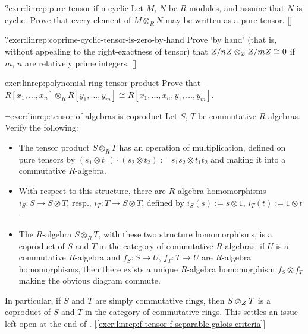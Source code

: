 \begin{exer}{$?$}{exer:linrep:pure-tensor-if-n-cyclic}
  Let $M$, $N$ be $R$-modules, and assume that $N$ is cyclic. Prove
  that every element of $M \otimes_R N$ may be written as a pure
  tensor. []
\end{exer}
\begin{exer}{$?$}{exer:linrep:coprime-cyclic-tensor-is-zero-by-hand}
  Prove `by hand' (that is, without appealing to the right-exactness
  of tensor) that $Z/nZ \otimes_{Z} Z/mZ \cong 0$ if $m$, $n$ are
  relatively prime
  integers. []
\end{exer}
\begin{exer}{}{exer:linrep:polynomial-ring-tensor-product}
  Prove that
  $R[x_1, \dots, x_n] \otimes_R R[y_1, \dots, y_m] \cong R[x_1, \dots,
  x_n, y_1, \dots, y_m]$.
\end{exer}
\begin{exer}{$\lnot$}{exer:linrep:tensor-of-algebras-is-coproduct}
  Let $S$, $T$ be commutative $R$-algebras. Verify the following:
  \begin{itemize}
  \item The tensor product $S \otimes_R T$ has an operation of
    multiplication, defined on pure tensors by
    $(s_1 \otimes t_1) \cdot (s_2 \otimes t_2) := s_1 s_2 \otimes t_1
    t_2$ and making it into a commutative $R$-algebra.
  \item With respect to this structure, there are $R$-algebra
    homomorphisms $i_S : S \to S \otimes T$, resp.,
    $i_T : T \to S \otimes T$, defined by $i_S(s) := s \otimes 1$,
    $i_T(t) := 1 \otimes t$.
  \item The $R$-algebra $S \otimes_R T$, with these two structure
    homomorphisms, is a coproduct of $S$ and $T$ in the category of
    commutative $R$-algebras: if $U$ is a commutative $R$-algebra and
    $f_S : S \to U$, $f_T : T \to U$ are $R$-algebra homomorphisms,
    then there exists a unique $R$-algebra homomorphism
    $f_S \otimes f_T$ making the obvious diagram commute.
  \end{itemize}
  In particular, if $S$ and $T$ are simply commutative rings, then
  $S \otimes_{Z} T$ is a coproduct of $S$ and $T$ in the category of
  commutative rings. This settles an issue left open at the end of
  . [\ref{exer:linrep:f-tensor-f-separable-galois-criteria}]
\end{exer}
